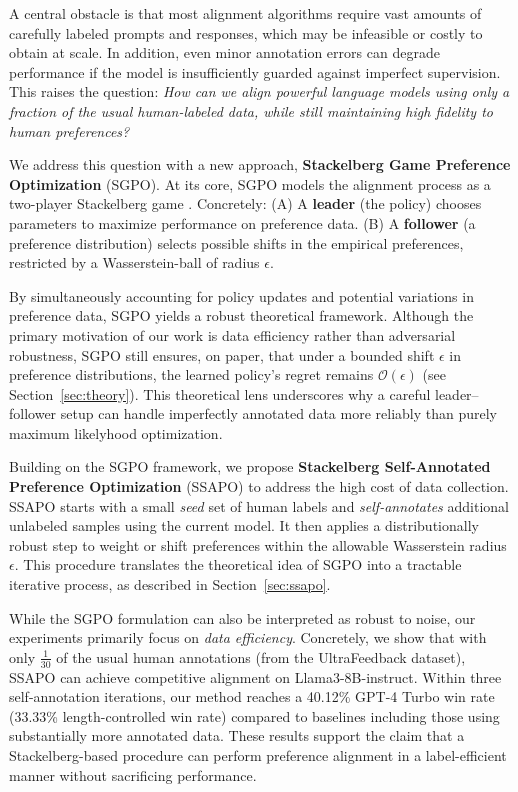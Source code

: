 A central obstacle is that most alignment algorithms require vast amounts of carefully labeled prompts and responses, which may be infeasible or costly to obtain at scale. In addition, even minor annotation errors can degrade performance if the model is insufficiently guarded against imperfect supervision. This raises the question: \emph{How can we align powerful language models using only a fraction of the usual human-labeled data, while still maintaining high fidelity to human preferences?}

We address this question with a new approach, \textbf{Stackelberg Game Preference Optimization} (SGPO). At its core, SGPO models the alignment process as a two-player Stackelberg game \cite{VonStackelberg1934Marktform,Basar1999DynamicNG}. Concretely:
(A) A \textbf{leader} (the policy) chooses parameters to maximize performance on preference data.
(B) A \textbf{follower} (a preference distribution) selects possible shifts in the empirical preferences, restricted by a Wasserstein-ball of radius $\epsilon$.

By simultaneously accounting for policy updates and potential variations in preference data, SGPO yields a robust theoretical framework. Although the primary motivation of our work is data efficiency rather than adversarial robustness, SGPO still ensures, on paper, that under a bounded shift $\epsilon$ in preference distributions, the learned policy’s regret remains $\mathcal{O}(\epsilon)$ (see Section~\ref{sec:theory}). This theoretical lens underscores why a careful leader--follower setup can handle imperfectly annotated data more reliably than purely maximum likelyhood optimization.

Building on the SGPO framework, we propose \textbf{Stackelberg Self-Annotated Preference Optimization} (SSAPO) to address the high cost of data collection. SSAPO starts with a small \emph{seed} set of human labels and \emph{self-annotates} additional unlabeled samples using the current model. It then applies a distributionally robust step to weight or shift preferences within the allowable Wasserstein radius $\epsilon$. This procedure translates the theoretical idea of SGPO into a tractable iterative process, as described in Section~\ref{sec:ssapo}.

While the SGPO formulation can also be interpreted as robust to noise, our experiments primarily focus on \emph{data efficiency}. Concretely, we show that with only $\tfrac{1}{30}$ of the usual human annotations (from the UltraFeedback dataset), SSAPO can achieve competitive alignment on Llama3-8B-instruct. Within three self-annotation iterations, our method reaches a 40.12\% GPT-4 Turbo win rate (33.33\% length-controlled win rate) compared to baselines including those using substantially more annotated data. These results support the claim that a Stackelberg-based procedure can perform preference alignment in a label-efficient manner without sacrificing performance.

